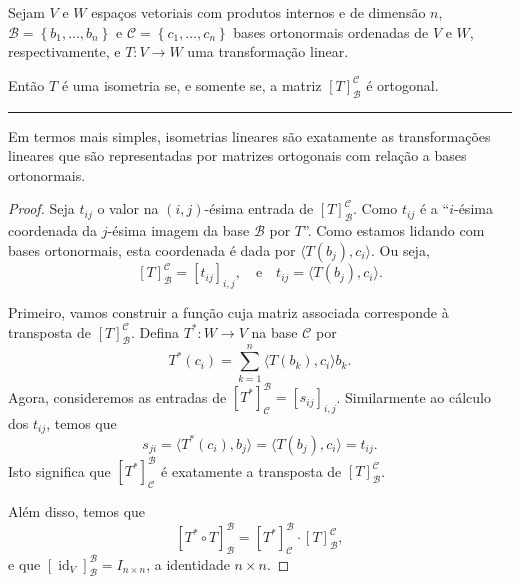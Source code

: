 \begin{theorem}
	Sejam $V$ e $W$ espaços vetoriais com produtos internos e de dimensão $n$, $\mathcal{B}=\left\{b_1,\ldots,b_n\right\}$ e $\mathcal{C}=\left\{c_1,\ldots,c_n\right\}$ bases ortonormais ordenadas de $V$ e $W$, respectivamente, e $T\colon V\to W$ uma transformação linear.
	
	Então $T$ é uma isometria se, e somente se, a matriz $[T]_{\mathcal{B}}^{\mathcal{C}}$ é ortogonal.
	
	\hrule
	
	Em termos mais simples, isometrias lineares são exatamente as transformações lineares que são representadas por matrizes ortogonais com relação a bases ortonormais.
\end{theorem}

\begin{proof}
	Seja $t_{ij}$ o valor na $(i,j)$-ésima entrada de $[T]_{\mathcal{B}}^{\mathcal{C}}$. Como $t_{ij}$ é a ``$i$-ésima coordenada da $j$-ésima imagem da base $\mathcal{B}$ por $T$''. Como estamos lidando com bases ortonormais, esta coordenada é dada por $\langle T(b_j),c_i\rangle$. Ou seja,
	\[[T]_{\mathcal{B}}^{\mathcal{C}}=[t_{ij}]_{i,j},\quad\text{e}\quad t_{ij}=\langle T(b_j),c_i\rangle.\]
	
	Primeiro, vamos construir a função cuja matriz associada corresponde à transposta de $[T]_{\mathcal{B}}^{\mathcal{C}}$. Defina $T^*\colon W\to V$ na base $\mathcal{C}$ por
	\[T^*(c_i)=\sum_{k=1}^n \langle T(b_k),c_i\rangle b_k.\]
	Agora, consideremos as entradas de $[T^*]_{\mathcal{C}}^{\mathcal{B}}=[s_{ij}]_{i,j}$. Similarmente ao cálculo dos $t_{ij}$, temos que
	\[s_{ji}=\langle T^*(c_i),b_j\rangle=\langle T(b_j),c_i\rangle=t_{ij}.\]
	Isto significa que $[T^*]_{\mathcal{C}}^\mathcal{B}$ é exatamente a transposta de $[T]_{\mathcal{B}}^{\mathcal{C}}$.
	
	Além disso, temos que
	\[[T^*\circ T]_{\mathcal{B}}^{\mathcal{B}}=[T^*]_{\mathcal{C}}^\mathcal{B}\cdot [T]_{\mathcal{B}}^{\mathcal{C}},\]
	e que $[\operatorname{id}_V]_{\mathcal{B}}^{\mathcal{B}}=I_{n\times n}$, a identidade $n\times n$.
	

\end{proof}
